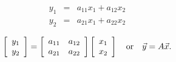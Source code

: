 \documentclass{ximera}
\begin{document}
\begin{eqnarray*}
y_1 &=& a_{11} x_1 + a_{12} x_2\\
y_2 &=& a_{21} x_1 + a_{22} x_2
\end{eqnarray*}

$$\left[{\begin{array}{c} y_1 \\ y_2 \\ \end{array}}\right] = \left[{\begin{array}{cc} a_{11} & a_{12} \\ a_{21} & a_{22} \\ \end{array}}\right] \left[{\begin{array}{c} x_1 \\ x_2 \\ \end{array}}\right]
\quad {\rm or} \quad \vec y = A \vec x.$$
\end{document}

